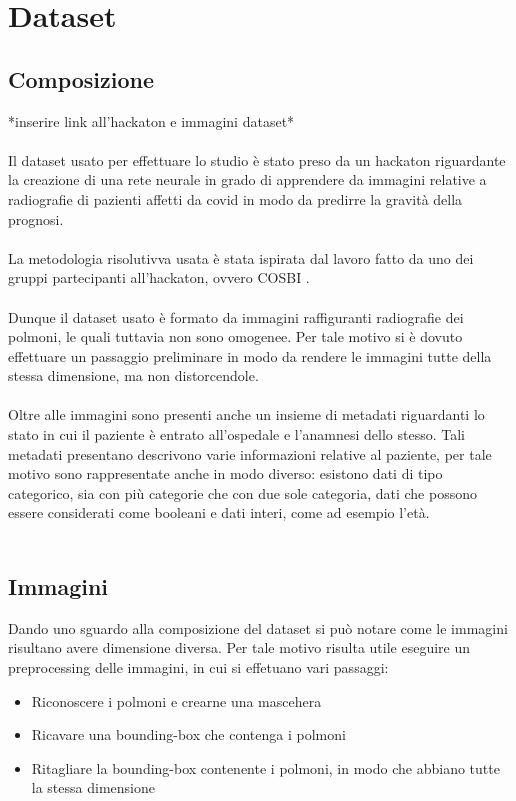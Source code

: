 \chapter{Dataset}
\label{ch:Dataset}
\section{Composizione}
*inserire link all'hackaton e immagini dataset*
\\\\
Il dataset usato per effettuare lo studio è stato preso da un hackaton \cite{ai} riguardante la creazione di una rete neurale in grado di apprendere 
da immagini relative a radiografie di pazienti affetti da covid in modo da predirre la gravità della prognosi.
\\\\
La metodologia risolutivva usata è stata ispirata dal lavoro fatto da uno dei gruppi partecipanti all'hackaton, ovvero COSBI \cite{cch}.
\\\\
Dunque il dataset usato è formato da immagini raffiguranti radiografie dei polmoni, le quali tuttavia non sono omogenee. Per tale motivo 
si è dovuto effettuare un passaggio preliminare in modo da rendere le immagini tutte della stessa dimensione, ma non distorcendole.
\\\\
Oltre alle immagini sono presenti anche un insieme di metadati riguardanti lo stato in cui il paziente è entrato all'ospedale e l'anamnesi dello stesso.
Tali metadati presentano descrivono varie informazioni relative al paziente, per tale motivo sono rappresentate anche in modo diverso: esistono dati di tipo categorico, sia con più categorie che con
due sole categoria, dati che possono essere considerati come booleani e dati interi, come ad esempio l'età.
\\\\
\section{Immagini}
Dando uno sguardo alla composizione del dataset si può notare come le immagini risultano avere dimensione diversa. Per tale motivo 
risulta utile eseguire un preprocessing delle immagini, in cui si effetuano vari passaggi:
\begin{itemize}
    \item Riconoscere i polmoni e crearne una mascehera
    \item Ricavare una bounding-box che contenga i polmoni
    \item Ritagliare la bounding-box contenente i polmoni, in modo che abbiano tutte la stessa dimensione
\end{itemize}

